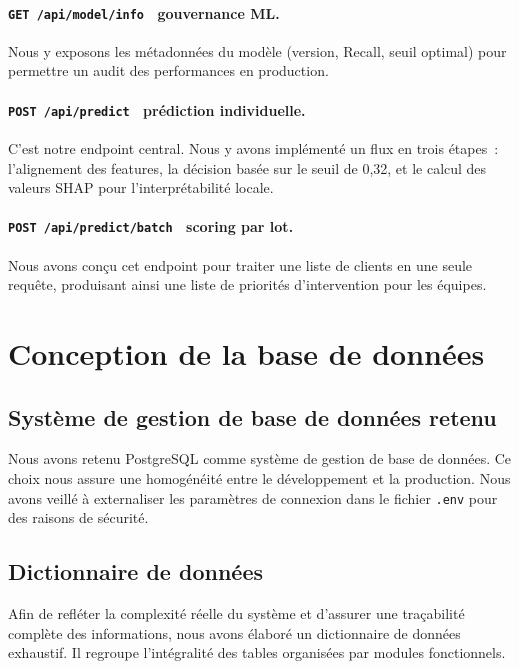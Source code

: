 \begin{enumerate}
\paragraph{\texttt{GET /api/model/info}~ gouvernance ML.}
Nous y exposons les métadonnées du modèle (version, Recall, seuil optimal) pour permettre un audit des performances en production.

\paragraph{\texttt{POST /api/predict}~ prédiction individuelle.}
C'est notre endpoint central. Nous y avons implémenté un flux en trois étapes~: l'alignement des features, la décision basée sur le seuil de 0,32, et le calcul des valeurs SHAP pour l'interprétabilité locale.

\paragraph{\texttt{POST /api/predict/batch}~ scoring par lot.}
Nous avons conçu cet endpoint pour traiter une liste de clients en une seule
requête, produisant ainsi une liste de priorités d'intervention pour les équipes.
\end{enumerate}
\section{Conception de la base de données}

\subsection{Système de gestion de base de données retenu}

Nous avons retenu PostgreSQL comme système de gestion de base de données. Ce choix nous assure une
homogénéité entre le développement et la production. Nous avons veillé à externaliser les paramètres de connexion dans le fichier
\texttt{.env} pour des raisons de sécurité.

\subsection{Dictionnaire de données}

Afin de refléter la complexité réelle du système et d'assurer une traçabilité complète des informations, nous avons élaboré un dictionnaire de données exhaustif. Il regroupe l'intégralité des tables organisées par modules fonctionnels.

